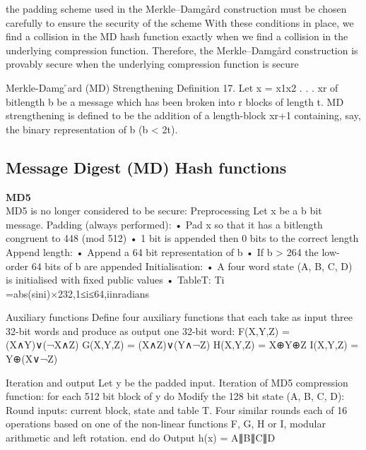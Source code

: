 the padding scheme used in the Merkle–Damgård construction must be chosen carefully to ensure the security of the scheme
With these conditions in place, we find a collision in the MD hash function exactly when we find a collision in the underlying compression function. Therefore, the Merkle–Damgård construction is provably secure when the underlying compression function is secure

Merkle-Damg ̊ard (MD) Strengthening
Definition 17.
Let x = x1x2 . . . xr of bitlength b be a message which has been broken into r blocks of length t. MD strengthening is defined to be the addition of a length-block xr+1 containing, say, the binary representation of b (b < 2t).

\subsection{Message Digest (MD) Hash functions}

\textbf{MD5}\\
MD5 is no longer considered to be secure:
Preprocessing
Let x be a b bit message. Padding (always performed):
• Pad x so that it has a bitlength congruent to 448 (mod 512) • 1 bit is appended then 0 bits to the correct length
Append length:
• Append a 64 bit representation of b
• If b > 264 the low-order 64 bits of b are appended Initialisation:
• A four word state (A, B, C, D) is initialised with fixed public values • TableT: Ti =abs(sini)×232,1≤i≤64,iinradians

Auxiliary functions
Define four auxiliary functions that each take as input three 32-bit words and produce as output one 32-bit word:
F(X,Y,Z) = (X∧Y)∨(¬X∧Z) G(X,Y,Z) = (X∧Z)∨(Y∧¬Z)
H(X,Y,Z) = X⊕Y⊕Z I(X,Y,Z) = Y⊕(X∨¬Z)

Iteration and output
Let y be the padded input.
Iteration of MD5 compression function:
for each 512 bit block of y do
Modify the 128 bit state (A, B, C, D):
Round inputs: current block, state and table T.
Four similar rounds each of 16 operations based on one of the non-linear functions F, G, H or I, modular arithmetic and left rotation.
end do
Output h(x) = A∥B∥C∥D


